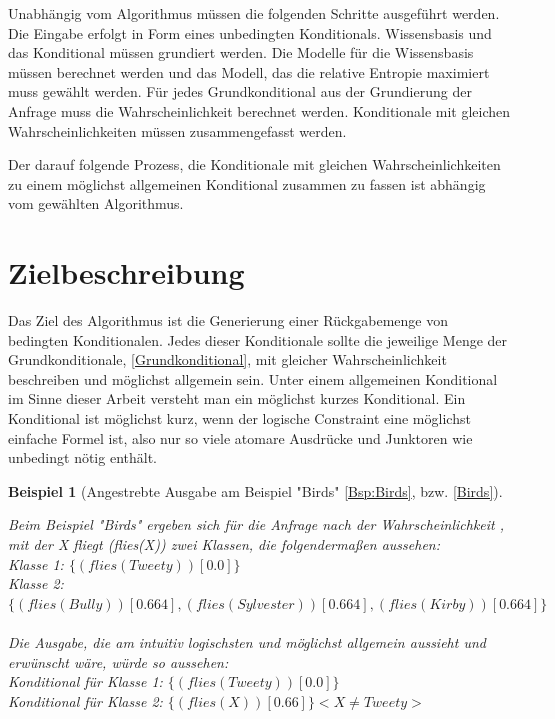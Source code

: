 \documentclass[a4paper, 11pt]{book}
\newtheorem{Bsp}{Beispiel}[section]
\begin{document}
Unabhängig vom Algorithmus müssen die folgenden Schritte ausgeführt werden. Die Eingabe erfolgt in Form eines unbedingten Konditionals. Wissensbasis und das Konditional müssen grundiert werden. Die Modelle für die Wissensbasis müssen berechnet werden und das Modell, das die relative Entropie maximiert muss gewählt werden. Für jedes Grundkonditional aus der Grundierung der Anfrage muss die Wahrscheinlichkeit berechnet werden. Konditionale mit gleichen Wahrscheinlichkeiten müssen zusammengefasst werden. 

Der darauf folgende Prozess, die Konditionale mit gleichen Wahrscheinlichkeiten zu einem möglichst allgemeinen Konditional zusammen zu fassen ist abhängig vom gewählten Algorithmus.

\section{Zielbeschreibung} \label{Zielbeschreibung}                                                                                                                                                                   
Das Ziel des Algorithmus ist die Generierung einer Rückgabemenge von bedingten Konditionalen. Jedes dieser Konditionale sollte die jeweilige Menge der Grundkonditionale, \ref{Grundkonditional}, mit gleicher Wahrscheinlichkeit beschreiben und möglichst allgemein sein. Unter einem allgemeinen Konditional im Sinne dieser Arbeit versteht man ein möglichst kurzes Konditional. Ein Konditional ist möglichst kurz, wenn der logische Constraint eine möglichst einfache Formel ist, also nur so viele atomare Ausdrücke und Junktoren wie unbedingt nötig enthält.


\begin{Bsp}[Angestrebte Ausgabe am Beispiel "{}Birds"{} \ref{Bsp:Birds}, bzw.  \ref{Birds}]
	\label{Ausgabe_Birds}

	Beim Beispiel "{}Birds"{} ergeben sich für die Anfrage nach der Wahrscheinlichkeit , mit der X fliegt (flies(X)) zwei Klassen, die folgendermaßen aussehen:\\
	
	\noindent
			Klasse 1: $\{(flies(Tweety))[0.0]\}$\\
			Klasse 2: $\{(flies(Bully))[0.664], (flies(Sylvester))[0.664], (flies(Kirby))[0.664]\}$\\
			\\
			Die Ausgabe, die am intuitiv logischsten und möglichst allgemein aussieht und erwünscht wäre, würde so aussehen:\\
				Konditional für Klasse 1: $\{(flies(Tweety))[0.0]\}$\\
				Konditional für Klasse 2: $\{(flies(X))[0.66]\} <X \neq Tweety>$\\
\end{Bsp}
\end{document}
